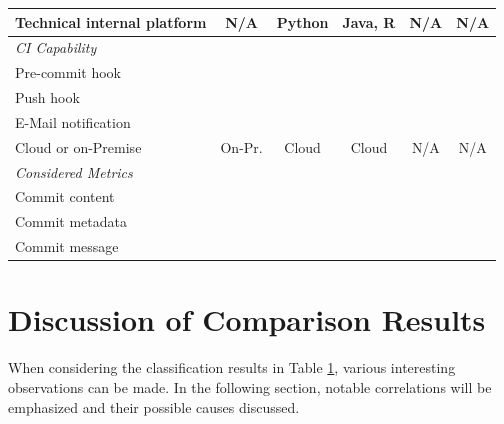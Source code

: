 \begin{table}[p]
\begin{tabular}{@{}lccccc@{}}
		Technical internal platform & N/A & Python & Java, R & N/A & N/A \\ \midrule
		\textit{CI Capability} & & & & & \\
		Pre-commit hook & \pointyes & \pointno & \pointno & \pnotapplicable & \pnotapplicable \\
		Push hook & \pointno & \pointyes & \pointno & \pnotapplicable & \pnotapplicable \\
		E-Mail notification & \pnotapplicable & \pointyes & \pointno & \pnotapplicable & \pnotapplicable \\
		Cloud or on-Premise & On-Pr. & Cloud & Cloud & N/A & N/A \\ \midrule
		\textit{Considered Metrics} & & & & & \\
		Commit content & \pointyes & \pointyes & \pointyes & \pointyes & \pointyes \\
		Commit metadata & \pointno & \pointno & \pointyes & \pointno & \pointno \\
		Commit message & \pointyes & \pointyes & \pointno & \pointyes & \pointyes \\ \bottomrule
	\end{tabular}
	\label{tab:classification}
\end{table}

\section{Discussion of Comparison Results}
\label{sec:discussion}


When considering the classification results in Table \ref{tab:classification}, various interesting observations can be made. In the following section, notable correlations will be emphasized and their possible causes discussed.

